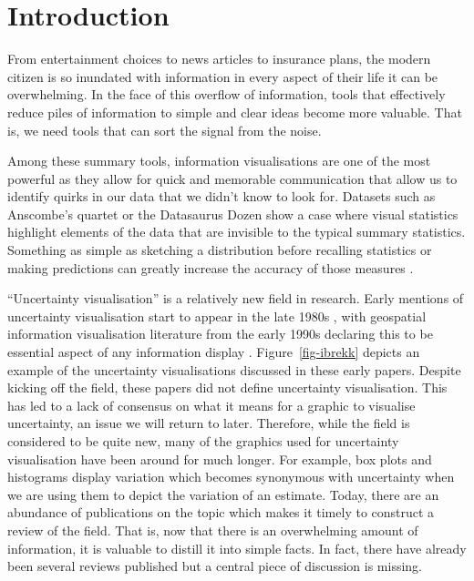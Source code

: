 \documentclass[
  12pt]{article}
\begin{document}
\newpage
{} %


\section{Introduction}\label{introduction}

From entertainment choices to news articles to insurance plans, the
modern citizen is so inundated with information in every aspect of their
life it can be overwhelming. In the face of this overflow of
information, tools that effectively reduce piles of information to
simple and clear ideas become more valuable. That is, we need tools that
can sort the signal from the noise.

Among these summary tools, information visualisations are one of the
most powerful as they allow for quick and memorable communication that
allow us to identify quirks in our data that we didn't know to look for.
Datasets such as Anscombe's quartet \citep{anscombe} or the Datasaurus
Dozen \citep{datasaurus, datasaurpkg} show a case where visual
statistics highlight elements of the data that are invisible to the
typical summary statistics. Something as simple as sketching a
distribution before recalling statistics or making predictions can
greatly increase the accuracy of those measures
\citep{Hullman2018, Goldstein2014}.

``Uncertainty visualisation'' is a relatively new field in research.
Early mentions of uncertainty visualisation start to appear in the late
1980s \citep{Ibrekk1987}, with geospatial information visualisation
literature from the early 1990s declaring this to be essential aspect of
any information display \citep{MacEachren1992, Carr1992}.
Figure~\ref{fig-ibrekk} depicts an example of the uncertainty
visualisations discussed in these early papers. Despite kicking off the
field, these papers did not define uncertainty visualisation. This has
led to a lack of consensus on what it means for a graphic to visualise
uncertainty, an issue we will return to later. Therefore, while the
field is considered to be quite new, many of the graphics used for
uncertainty visualisation have been around for much longer. For example,
box plots and histograms display variation which becomes synonymous with
uncertainty when we are using them to depict the variation of an
estimate. Today, there are an abundance of publications on the topic
which makes it timely to construct a review of the field. That is, now
that there is an overwhelming amount of information, it is valuable to
distill it into simple facts. In fact, there have already been several
reviews published but a central piece of discussion is missing.
\end{document}
